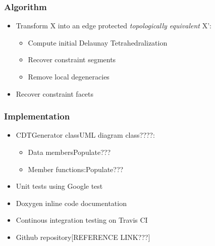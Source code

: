 \documentclass{beamer}
\begin{document}
	\begin{frame}
		\frametitle{Algorithm} 
			\begin{itemize}
				\item Transform X into an edge protected \textit{topologically equivalent} X':	
				\begin{itemize}
					\item Compute initial Delaunay Tetrahedralization	
					\item Recover constraint segments
					\item Remove local degeneracies
				\end{itemize}
				\item Recover constraint facets
			\end{itemize}		
	\end{frame}
	\begin{frame}
		\frametitle{Implementation}
			\begin{itemize}
				\item CDTGenerator class{UML diagram class????}:
					\begin{itemize}
						\item Data members{Populate???}
						\item Member functions:{Populate???}	
					\end{itemize}		
				\item Unit tests using Google test
				\item Doxygen inline code documentation
				\item Continous integration testing on Travis CI	
				\item Github repository[REFERENCE LINK???]	
			\end{itemize}
	\end{frame}	
\end{document}
